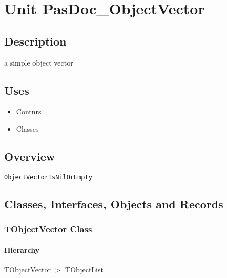 \documentclass{report}
\newif\ifpdf
\begin{document}
\chapter{Unit PasDoc{\_}ObjectVector}
\label{PasDoc_ObjectVector}
\section{Description}
  a simple object vector
\section{Uses}
\begin{itemize}
\item \begin{ttfamily}Contnrs\end{ttfamily}\item \begin{ttfamily}Classes\end{ttfamily}\end{itemize}
\section{Overview}
\begin{description}
\item[\texttt{\begin{ttfamily}TObjectVector\end{ttfamily} Class}]
\end{description}
\begin{description}
\item[\texttt{ObjectVectorIsNilOrEmpty}]
\end{description}
\section{Classes, Interfaces, Objects and Records}
\ifpdf
\subsection*{\large{\textbf{TObjectVector Class}}\normalsize\hspace{1ex}\hrulefill}
\else
\subsection*{TObjectVector Class}
\fi
\label{PasDoc_ObjectVector.TObjectVector}
\subsubsection*{\large{\textbf{Hierarchy}}\normalsize\hspace{1ex}\hfill}
TObjectVector {$>$} TObjectList
\end{document}
